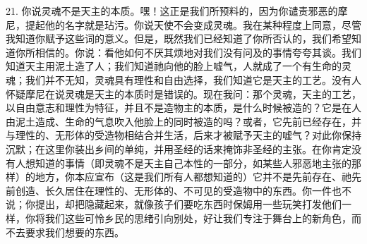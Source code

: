 21. 你说灵魂不是天主的本质。嘿！这正是我们所预料的，因为你谴责邪恶的摩尼，提起他的名字就是玷污。你说天使不会变成灵魂。我在某种程度上同意，尽管我知道你赋予这些词的意义。但是，既然我们已经知道了你所否认的，我们希望知道你所相信的。你说：看他如何不厌其烦地对我们没有问及的事情夸夸其谈。我们知道天主用泥土造了人；我们知道祂向他的脸上嘘气，人就成了一个有生命的灵魂；我们并不无知，灵魂具有理性和自由选择，我们知道它是天主的工艺。没有人怀疑摩尼在说灵魂是天主的本质时是错误的。现在我问：那个灵魂，天主的工艺，以自由意志和理性为特征，并且不是造物主的本质，是什么时候被造的？它是在人由泥土造成、生命的气息吹入他脸上的同时被造的吗？或者，它先前已经存在，并与理性的、无形体的受造物相结合并生活，后来才被赋予天主的嘘气？对此你保持沉默；在这里你装出乡间的单纯，并用圣经的话来掩饰非圣经的主张。在你肯定没有人想知道的事情（即灵魂不是天主自己本性的一部分，如某些人邪恶地主张的那样）的地方，你本应宣布（这是我们所有人都想知道的）它并不是先前存在、祂先前创造、长久居住在理性的、无形体的、不可见的受造物中的东西。你一件也不说；你提出，却把隐藏起来，就像孩子们要吃东西时保姆用一些玩笑打发他们一样，你将我们这些可怜乡民的思绪引向别处，好让我们专注于舞台上的新角色，而不去要求我们想要的东西。\par

